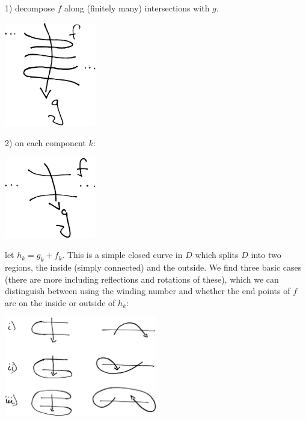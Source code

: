 \documentclass[12pt,a4paper]{article}
\begin{document}

1) decompose $f$ along (finitely many) intersections
with $g.$

\begin{center}
\includegraphics[width=0.3\textwidth]{snake-decompose.eps}
\end{center}


2) on each component $k$:

\begin{center}
\includegraphics[width=0.3\textwidth]{snake-component.eps}
\end{center}

let $h_k = g_k + f_k.$
This is a simple closed curve in $D$ which splits $D$
into two regions, the inside (simply connected) and the
outside.
We find three basic cases (there are more including reflections
and rotations of these), which we can distinguish between
using the winding number and whether the end points
of $f$ are on the inside or outside of $h_k$:

\begin{center}
\includegraphics[width=0.5\textwidth]{snake-cases.eps}
\end{center}


\end{document}
